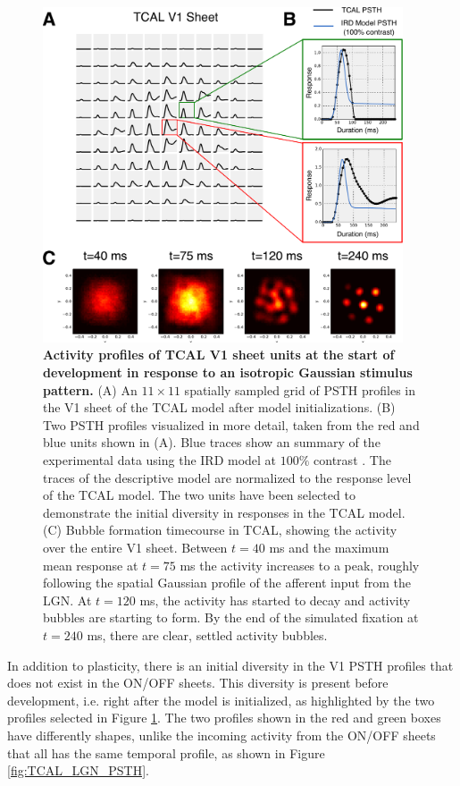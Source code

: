 \documentclass[phd,ianc,twoside]{infthesis}
\begin{document}
\begin{figure}
\center
\includegraphics[width=0.95\textwidth]{./figures/TCAL_V1_PSTH.pdf}
\caption{{\bf Activity profiles of TCAL V1 sheet units at the start of
    development in response to an isotropic Gaussian stimulus pattern.}
  (A) An $11\times11$ spatially sampled grid of PSTH profiles in the V1
  sheet of the TCAL model after model initializations. (B) Two PSTH
  profiles visualized in more detail, taken from the red and blue units
  shown in (A). Blue traces show an summary of the experimental data
  using the IRD model at $100\%$ contrast
  \citep{albrecht_jneurophys02}.  The traces of the descriptive model
  are normalized to the response level of the TCAL model. The two units
  have been selected to demonstrate the initial diversity in responses
  in the TCAL model. (C) Bubble formation timecourse in TCAL, showing
  the activity over the entire V1 sheet. Between $t=40$ \si{\ms} and the
  maximum mean response at $t=75$ \si{\ms} the activity increases to a
  peak, roughly following the spatial Gaussian profile of the afferent
  input from the LGN. At $t=120$ \si{\ms}, the activity has started to
  decay and activity bubbles are starting to form. By the end of the
  simulated fixation at $t=240$ \si{\ms}, there are clear, settled
  activity bubbles.}
\label{fig:TCAL_V1_PSTH}
\end{figure}


In addition to plasticity, there is an initial diversity in the V1 PSTH
profiles that does not exist in the ON/OFF sheets. This diversity is
present before development, i.e. right after the model is initialized,
as highlighted by the two profiles selected in Figure
\ref{fig:TCAL_V1_PSTH}. The two profiles shown in the red and green
boxes have differently shapes, unlike the incoming activity from the
ON/OFF sheets that all has the same temporal profile, as shown in
Figure \ref{fig:TCAL_LGN_PSTH}.
\end{document}
